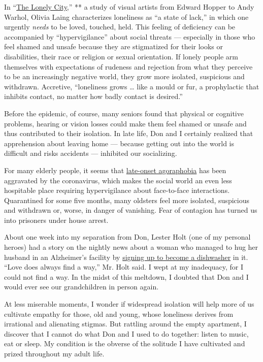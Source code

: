 In
``\href{https://www.nytimes3xbfgragh.onion/2016/03/20/books/review/the-lonely-city-by-olivia-laing.html}{The
Lonely City,}'' ** a study of visual artists from Edward Hopper to Andy
Warhol, Olivia Laing characterizes loneliness as ``a state of lack,'' in
which one urgently \emph{needs} to be loved, touched, held. This feeling
of deficiency can be accompanied by ``hypervigilance'' about social
threats --- especially in those who feel shamed and unsafe because they
are stigmatized for their looks or disabilities, their race or religion
or sexual orientation. If lonely people arm themselves with expectations
of rudeness and rejection from what they perceive to be an increasingly
negative world, they grow more isolated, suspicious and withdrawn.
Accretive, ``loneliness grows \ldots{} like a mould or fur, a
prophylactic that inhibits contact, no matter how badly contact is
desired.''

Before the epidemic, of course, many seniors found that physical or
cognitive problems, hearing or vision losses could make them feel shamed
or unsafe and thus contributed to their isolation. In late life, Don and
I certainly realized that apprehension about leaving home --- because
getting out into the world is difficult and risks accidents ---
inhibited our socializing.

For many elderly people, it seems that
\href{https://ajp.psychiatryonline.org/doi/10.1176/appi.ajp.2013.12091235}{late-onset
agoraphobia} has been aggravated by the coronavirus, which makes the
social world an even less hospitable place requiring hypervigilance
about face-to-face interactions. Quarantined for some five months, many
oldsters feel more isolated, suspicious and withdrawn or, worse, in
danger of vanishing. Fear of contagion has turned us into prisoners
under house arrest.

About one week into my separation from Don, Lester Holt (one of my
personal heroes) had a story on the nightly news about a woman who
managed to hug her husband in an Alzheimer's facility by
\href{https://www.facebookcorewwwi.onion/watch/?v=669777473751880}{signing
up to become a dishwasher} in it. ``Love does always find a way,'' Mr.
Holt said. I wept at my inadequacy, for I could not find a way. In the
midst of this meltdown, I doubted that Don and I would ever see our
grandchildren in person again.

At less miserable moments, I wonder if widespread isolation will help
more of us cultivate empathy for those, old and young, whose loneliness
derives from irrational and alienating stigmas. But rattling around the
empty apartment, I discover that I cannot do what Don and I used to do
together: listen to music, eat or sleep. My condition is the obverse of
the solitude I have cultivated and prized throughout my adult life.

